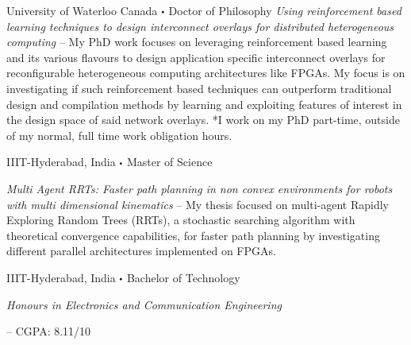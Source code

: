 	{%
		University of Waterloo Canada}
	{%
		$\sbullet$ Doctor of Philosophy
	}	
	{
	\vspace{1ex}
	\textit{Using reinforcement based learning techniques to design interconnect overlays for distributed heterogeneous computing}
	\vspace{1ex}
	\justify
	-- My PhD work focuses on leveraging reinforcement based learning and its various flavours to design application specific interconnect overlays for reconfigurable heterogeneous computing architectures like FPGAs. My focus is on investigating if such reinforcement based techniques can outperform traditional design and compilation methods by learning and exploiting features of interest in the design space of said network overlays.
	\justify
	*I work on my PhD part-time, outside of my normal, full time work obligation hours.
	}

	{%
		IIIT-Hyderabad, India
	}
	{%
		$\sbullet$ Master of Science
	}	
	{
	\vspace{1ex}
	\textit{Multi Agent RRTs: Faster path planning in non convex environments for robots with multi dimensional kinematics}
	\vspace{1ex}
	\justify
	-- My thesis focused on multi-agent Rapidly Exploring Random Trees (RRTs), a stochastic searching algorithm with theoretical convergence capabilities, for faster path planning by investigating different parallel architectures implemented on FPGAs.
	
	}

	{%
		IIIT-Hyderabad, India}
	{%
		$\sbullet$ Bachelor of Technology
	}	
	{
	\vspace{1ex}
	\textit{Honours in Electronics and Communication Engineering}
	\vspace{1ex}
	
	-- CGPA: 8.11/10
	}